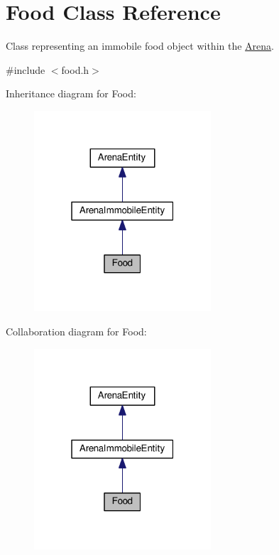 \hypertarget{classFood}{}\section{Food Class Reference}
\label{classFood}


Class representing an immobile food object within the \hyperlink{classArena}{Arena}.  




{\ttfamily \#include $<$food.\+h$>$}



Inheritance diagram for Food\+:\nopagebreak
\begin{figure}[H]
\begin{center}
\leavevmode
\includegraphics[width=187pt]{classFood__inherit__graph}
\end{center}
\end{figure}


Collaboration diagram for Food\+:\nopagebreak
\begin{figure}[H]
\begin{center}
\leavevmode
\includegraphics[width=187pt]{classFood__coll__graph}
\end{center}
\end{figure}
